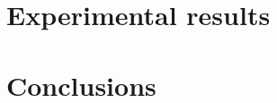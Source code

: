 \section{Experimental results} %
\label{sec:hp:experimental_results}


\section{Conclusions}
\label{sec:hp:conclusion}
